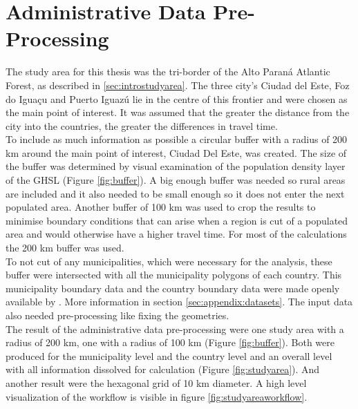 \documentclass[11pt, a4paper]{report}
\begin{document}
\section{Administrative Data Pre-Processing}
The study area for this thesis was the tri-border of the Alto Paraná Atlantic Forest, as described in \ref{sec:introstudyarea}. The three city's Ciudad del Este, Foz do Iguaçu and  Puerto Iguazú lie in the centre of this frontier and were chosen as the main point of interest. It was assumed that the greater the distance from the city into the countries, the greater the differences in travel time. \\
%
To include as much information as possible a circular buffer with a radius of 200 km around the main point of interest, Ciudad Del Este, was created. The size of the buffer was determined by visual examination of the population density layer of the GHSL \citet{european_commission_joint_research_centre_global_2021} (Figure \ref{fig:buffer}). A big enough buffer was needed so rural areas are included and it also needed to be small enough so it does not enter the next populated area. Another buffer of 100 km was used to crop the results to minimise boundary conditions that can arise when a region is cut of a populated area and would otherwise have a higher travel time. For most of the calculations the 200 km buffer was used. \\
%
To not cut of any municipalities, which were necessary for the analysis, these buffer were intersected with all the municipality polygons of each country. This municipality boundary data and the country boundary data  were made openly available by \citet{runfola_geoboundaries_2020}. More information in section \ref{sec:appendix:datasets}. The input data also needed pre-processing like fixing the geometries.  \\
%
The result of the administrative data pre-processing were one study area with a radius of 200 km, one with a radius of 100 km (Figure \ref{fig:buffer}). Both were produced for the municipality level and the country level and an overall level with all information dissolved for calculation (Figure \ref{fig:studyarea}). And another result were the hexagonal grid of 10 km diameter. A high level visualization of the workflow is visible in figure \ref{fig:studyareaworkflow}.
\end{document}
